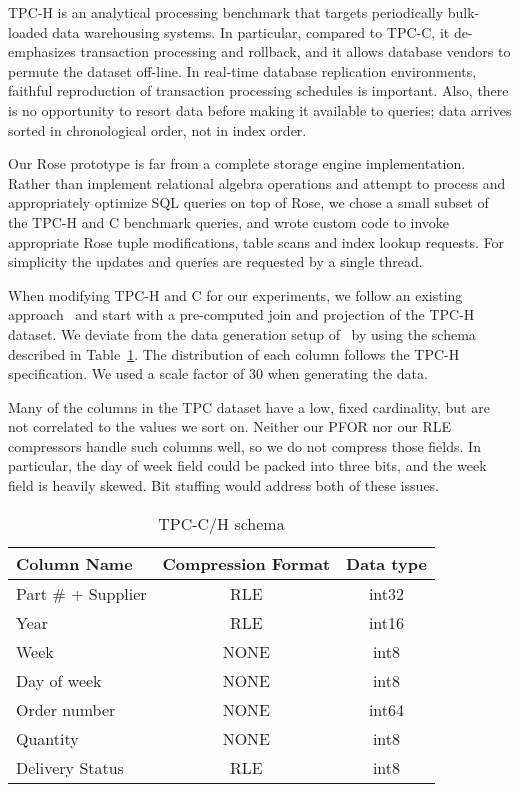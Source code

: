 \documentclass{vldb}
\newcommand{\rows}{Rose\xspace}
\begin{document}
TPC-H is an analytical processing benchmark that targets periodically
bulk-loaded data warehousing systems.  In particular, compared to
TPC-C, it de-emphasizes transaction processing and rollback, and it
allows database vendors to permute the dataset off-line.  In real-time
database replication environments, faithful reproduction of
transaction processing schedules is important.  Also, there is no
opportunity to resort data before making it available to queries; data
arrives sorted in chronological order, not in index order.

Our \rows prototype is far from a complete storage engine
implementation.  Rather than implement relational algebra operations
and attempt to process and appropriately optimize SQL queries on top
of \rows, we chose a small subset of the TPC-H and C benchmark
queries, and wrote custom code to invoke appropriate \rows tuple
modifications, table scans and index lookup requests.  For simplicity
the updates and queries are requested by a
single thread.

When modifying TPC-H and C for our experiments, we follow an existing
approach~\cite{entropy,bitsForChronos} and start with a pre-computed join
and projection of the TPC-H dataset.  We deviate from the data
generation setup of~\cite{bitsForChronos} by using the schema
described in Table~\ref{tab:tpc-schema}.  The distribution of each
column follows the TPC-H specification.  We used a scale factor of 30
when generating the data.

Many of the columns in the
TPC dataset have a low, fixed cardinality, but are not correlated to the values we sort on.
Neither our PFOR nor our RLE compressors handle such columns well, so
we do not compress those fields.  In particular, the day of week field
could be packed into three bits, and the week field is heavily skewed.  Bit stuffing would address both of these issues.

\begin{table}
\caption{TPC-C/H schema}
\centering
\label{tab:tpc-schema}
\begin{tabular}{|l|c|c|} \hline
Column Name     & Compression Format &  Data type\\ \hline
Part \# + Supplier & RLE       & int32              \\ \hline
Year            & RLE       & int16              \\\hline
Week            & NONE      & int8               \\\hline
Day of week     & NONE      & int8               \\\hline
Order number    & NONE      & int64              \\\hline
Quantity        & NONE      & int8               \\\hline
Delivery Status & RLE       & int8               \\\hline
\end{tabular}
\end{table}
\end{document}
